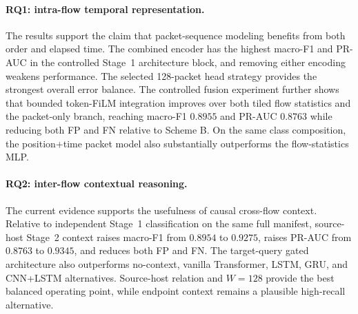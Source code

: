 \documentclass[11pt,fleqn]{report}
\begin{document}
\paragraph{RQ1: intra-flow temporal representation.}
The results support the claim that packet-sequence modeling benefits from both
order and elapsed time. The combined encoder has the highest macro-F1 and
PR-AUC in the controlled Stage~1 architecture block, and removing either
encoding weakens performance. The selected 128-packet head strategy provides
the strongest overall error balance. The controlled fusion experiment further
shows that bounded token-FiLM integration improves over both tiled flow
statistics and the packet-only branch, reaching macro-F1 $0.8955$ and PR-AUC
$0.8763$ while reducing both FP and FN relative to Scheme B. On the same class
composition, the position+time packet model also substantially outperforms the
flow-statistics MLP. 

\paragraph{RQ2: inter-flow contextual reasoning.}
The current evidence supports the usefulness of causal cross-flow context.
Relative to independent Stage~1 classification on the same full manifest,
source-host Stage~2 context raises macro-F1 from $0.8954$ to $0.9275$, raises
PR-AUC from $0.8763$ to $0.9345$, and reduces both FP and FN. The target-query
gated architecture also outperforms no-context, vanilla Transformer, LSTM,
GRU, and CNN+LSTM alternatives. Source-host relation and $W=128$ provide the
best balanced operating point, while endpoint context remains a plausible
high-recall alternative.


\end{document}
